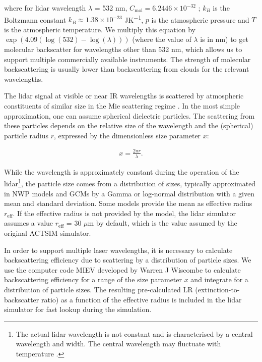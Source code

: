 \noindent where for lidar wavelength $\lambda$ = 532 nm, $C_\text{mol} = 6.2446\times 10^{-32}$
; $k_B$ is the Boltzmann constant $k_B \approx 1.38\times 10^{-23}$ \unit{JK^{-1}},
$p$ is the atmospheric pressure and $T$ is the atmospheric temperature.
We multiply this equation by $\exp(4.09(\log(532) - \log(\lambda)))$ (where the value of $\lambda$ is in nm)
to get molecular backscatter for wavelengths other than 532 nm, which allows us to support multiple commercially available instruments.
The strength of molecular backscattering is usually lower than
backscattering from clouds for the relevant wavelengths.

The lidar signal at visible or near IR wavelengths is scattered by
atmospheric constituents of similar size in the Mie scattering regime \citep{mie1908}.
In the most simple approximation,
one can assume spherical dielectric particles. The scattering from these particles depends on the
relative size of the wavelength and the (spherical) particle radius $r$, expressed by the
dimensionless size parameter $x$:

\begin{align}
x = \frac{2\pi r}{\lambda} .
\end{align}

While the wavelength is approximately constant during the operation of the lidar\footnote{The actual lidar wavelength is not constant and is characterised
by a central wavelength and width. The central wavelength may fluctuate with
temperature \citep{wiegner2015}.},
the particle size comes from a distribution of sizes, typically approximated
in NWP models and GCMs by a Gamma or log-normal distribution with a given mean
and standard deviation. Some models provide the mean as effective radius $r_\text{eff}$.
If the effective radius is not provided by the model, the lidar simulator
assumes a value $r_\text{eff}$ = 30 $\mu$m by default, which is the value assumed by the original ACTSIM
simulator.

In order to support multiple laser wavelengths, it is necessary
to calculate backscattering efficiency due to scattering by a distribution
of particle sizes. We use the computer code MIEV developed by Warren J Wiscombe
\citep{wiscombe1979,wiscombe1980} to
calculate backscattering efficiency for a range of the size parameter
$x$ and integrate for a distribution of particle sizes. The resulting
pre-calculated LR (extinction-to-backscatter ratio) as a function
of the effective radius is included in the lidar simulator for fast lookup
during the simulation.

